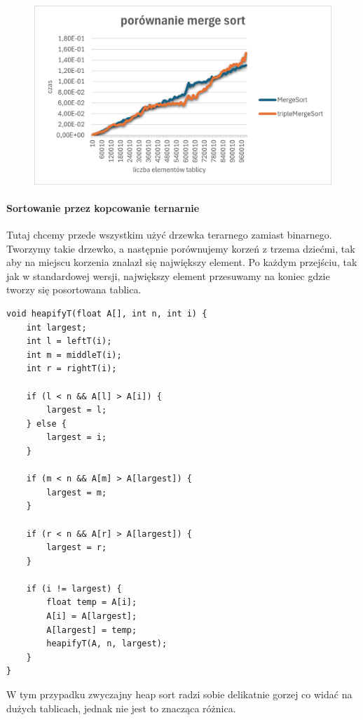 \documentclass{article}
\begin{document}
	\begin{figure}[H]
		\centering
		\includegraphics[width=\textwidth]{merge.png}
	\end{figure}
	
	\paragraph{Sortowanie przez kopcowanie ternarnie\\}
	Tutaj chcemy przede wszystkim użyć drzewka terarnego zamiast binarnego. Tworzymy takie drzewko, a następnie porównujemy korzeń z trzema dziećmi, tak aby na miejscu korzenia znalazł się największy element. Po każdym przejściu, tak jak w standardowej wersji, największy element przesuwamy na koniec gdzie tworzy się posortowana tablica.
	
	\begin{lstlisting}
void heapifyT(float A[], int n, int i) {
	int largest;
	int l = leftT(i);
	int m = middleT(i);
	int r = rightT(i);
	
	if (l < n && A[l] > A[i]) {
		largest = l;
	} else {
		largest = i;
	}
	
	if (m < n && A[m] > A[largest]) {
		largest = m;
	}
	
	if (r < n && A[r] > A[largest]) {
		largest = r;
	}
	
	if (i != largest) {
		float temp = A[i];
		A[i] = A[largest];
		A[largest] = temp;
		heapifyT(A, n, largest);
	}
}
	\end{lstlisting}
	
	W tym przypadku zwyczajny heap sort radzi sobie delikatnie gorzej co widać na dużych tablicach, jednak nie jest to znacząca różnica. 
	
\end{document}
